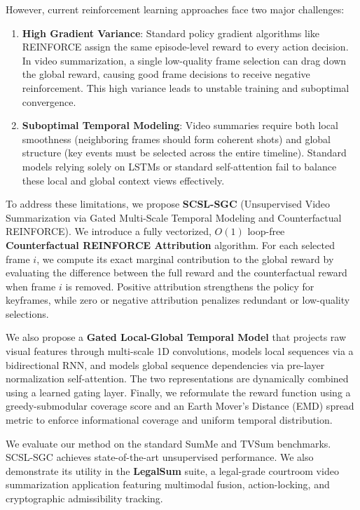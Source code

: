 \documentclass[letterpaper]{article} %
\begin{document}
However, current reinforcement learning approaches face two major challenges:
\begin{enumerate}
    \item \textbf{High Gradient Variance}: Standard policy gradient algorithms like REINFORCE assign the same episode-level reward to every action decision. In video summarization, a single low-quality frame selection can drag down the global reward, causing good frame decisions to receive negative reinforcement. This high variance leads to unstable training and suboptimal convergence.
    \item \textbf{Suboptimal Temporal Modeling}: Video summaries require both local smoothness (neighboring frames should form coherent shots) and global structure (key events must be selected across the entire timeline). Standard models relying solely on LSTMs or standard self-attention fail to balance these local and global context views effectively.
\end{enumerate}

To address these limitations, we propose \textbf{SCSL-SGC} (Unsupervised Video Summarization via Gated Multi-Scale Temporal Modeling and Counterfactual REINFORCE). We introduce a fully vectorized, $O(1)$ loop-free \textbf{Counterfactual REINFORCE Attribution} algorithm. For each selected frame $i$, we compute its exact marginal contribution to the global reward by evaluating the difference between the full reward and the counterfactual reward when frame $i$ is removed. Positive attribution strengthens the policy for keyframes, while zero or negative attribution penalizes redundant or low-quality selections.

We also propose a \textbf{Gated Local-Global Temporal Model} that projects raw visual features through multi-scale 1D convolutions, models local sequences via a bidirectional RNN, and models global sequence dependencies via pre-layer normalization self-attention. The two representations are dynamically combined using a learned gating layer. Finally, we reformulate the reward function using a greedy-submodular coverage score and an Earth Mover's Distance (EMD) spread metric to enforce informational coverage and uniform temporal distribution.

We evaluate our method on the standard SumMe \cite{gygli2014creating} and TVSum \cite{song2015tvsum} benchmarks. SCSL-SGC achieves state-of-the-art unsupervised performance. We also demonstrate its utility in the \textbf{LegalSum} suite, a legal-grade courtroom video summarization application featuring multimodal fusion, action-locking, and cryptographic admissibility tracking.
\end{document}
